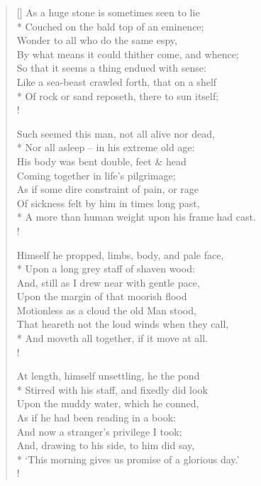 \documentclass[MAIN]{subfiles}
\begin{document}
\begin{verse}[\versewidth]
As a huge stone is sometimes seen to lie\\*
\vin Couched on the bald top of an eminence;\\
Wonder to all who do the same espy,\\
\vin By what means it could thither come, and whence;\\ 
\vin So that it seems a thing endued with sense:\\
Like a sea-beast crawled forth, that on a shelf\\* 
Of rock or sand reposeth, there to sun itself;\\!

Such seemed this man, not all alive nor dead,\\* 
\vin Nor all asleep -- in his extreme old age:\\
His body was bent double, feet \& head\\
\vin Coming together in life's pilgrimage;\\
\vin As if some dire constraint of pain, or rage\\
Of sickness felt by him in times long past,\\*
A more than human weight upon his frame had cast.\\!

Himself he propped, limbs, body, and pale face,\\*
\vin Upon a long grey staff of shaven wood:\\
And, still as I drew near with gentle pace,\\ 
\vin Upon the margin of that moorish flood\\
\vin Motionless as a cloud the old Man stood,\\
That heareth not the loud winds when they call,\\*
And moveth all together, if it move at all.\\!

At length, himself unsettling, he the pond\\*
\vin Stirred with his staff, and fixedly did look\\ 
Upon the muddy water, which he conned,\\
\vin As if he had been reading in a book:\\
\vin And now a stranger's privilege I took;\\
And, drawing to his side, to him did say,\\*
`This morning gives us promise of a glorious day.'\\!


\end{verse}
\end{document}
